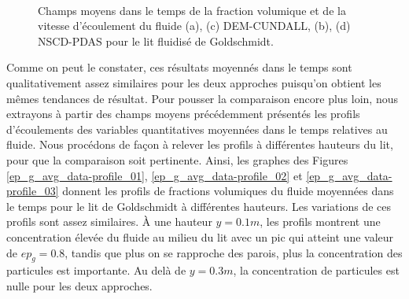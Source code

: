 \begin{figure}[h!]
\centering
\hspace{4em}%
   \\
\caption{\centering Champs moyens dans le temps de la fraction volumique et de la vitesse d'écoulement du fluide (a), (c) DEM-CUNDALL, (b), (d) NSCD-PDAS pour le lit fluidisé de Goldschmidt.}\label{lit_fluidisé}
\end{figure}
\vspace{0.8cm}
Comme on peut le constater, ces résultats moyennés dans le temps sont qualitativement assez similaires pour les deux approches puisqu'on obtient les mêmes tendances de résultat. Pour pousser la comparaison encore plus loin, nous extrayons à partir des champs moyens précédemment présentés les profils d'écoulements des variables quantitatives moyennées dans le temps relatives au fluide. Nous procédons de façon à relever les profils à différentes hauteurs du lit, pour que la comparaison soit pertinente. Ainsi, les graphes des Figures \ref{ep_g_avg_data-profile_01}, \ref{ep_g_avg_data-profile_02} et \ref{ep_g_avg_data-profile_03} donnent les profils de fractions volumiques du fluide moyennées dans le temps pour le lit de Goldschmidt à différentes hauteurs. Les variations de ces profils sont assez similaires. À une hauteur $y = 0.1m$, les profils montrent une concentration élevée du fluide au milieu du lit avec un pic qui atteint une valeur de $ep_g = 0.8$, tandis que plus on se rapproche des parois, plus la concentration des particules est importante. Au delà de $y = 0.3m$, la concentration de particules est nulle pour les deux approches.
